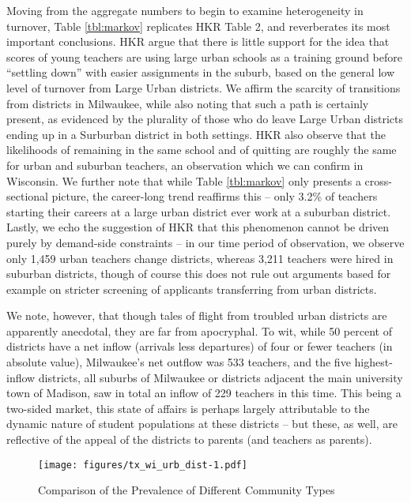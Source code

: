 \documentclass[12pt,]{article}
\begin{document}
Moving from the aggregate numbers to begin to examine heterogeneity in
turnover, Table \ref{tbl:markov} replicates HKR Table 2, and
reverberates its most important conclusions. HKR argue that there is
little support for the idea that scores of young teachers are using
large urban schools as a training ground before ``settling down'' with
easier assignments in the suburb, based on the general low level of
turnover from Large Urban districts. We affirm the scarcity of
transitions from districts in Milwaukee, while also noting that such a
path is certainly present, as evidenced by the plurality of those who do
leave Large Urban districts ending up in a Surburban district in both
settings. HKR also observe that the likelihoods of remaining in the same
school and of quitting are roughly the same for urban and suburban
teachers, an observation which we can confirm in Wisconsin. We further
note that while Table \ref{tbl:markov} only presents a cross-sectional
picture, the career-long trend reaffirms this -- only 3.2\% of teachers
starting their careers at a large urban district ever work at a suburban
district. Lastly, we echo the suggestion of HKR that this phenomenon
cannot be driven purely by demand-side constraints -- in our time period
of observation, we observe only 1,459 urban teachers change districts,
whereas 3,211 teachers were hired in suburban districts, though of
course this does not rule out arguments based for example on stricter
screening of applicants transferring from urban districts.

We note, however, that though tales of flight from troubled urban
districts are apparently anecdotal, they are far from apocryphal. To
wit, while 50 percent of districts have a net inflow (arrivals less
departures) of four or fewer teachers (in absolute value), Milwaukee's
net outflow was 533 teachers, and the five highest-inflow districts, all
suburbs of Milwaukee or districts adjacent the main university town of
Madison, saw in total an inflow of 229 teachers in this time. This being
a two-sided market, this state of affairs is perhaps largely
attributable to the dynamic nature of student populations at these
districts -- but these, as well, are reflective of the appeal of the
districts to parents (and teachers as parents).

\begin{figure}[htbp]
\centering
\texttt{[image: figures/tx\_wi\_urb\_dist-1.pdf]}
\caption{\label{fig:ti_wi_urb}Comparison of the Prevalence of Different
Community Types}
\end{figure}
\end{document}
